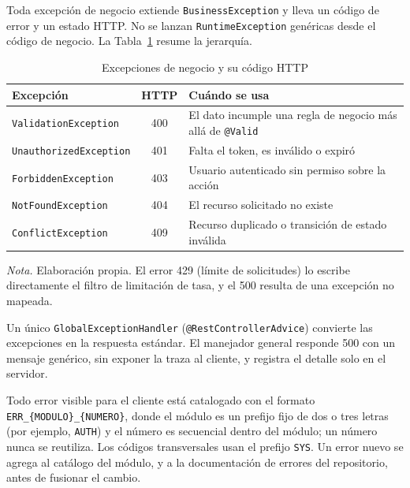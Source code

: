 Toda excepción de negocio extiende \texttt{BusinessException} y lleva un código de error y un estado HTTP. No se lanzan \texttt{RuntimeException} genéricas desde el código de negocio. La Tabla~\ref{tab:estandar_excepciones} resume la jerarquía.

\begin{table}[H]
\caption{Excepciones de negocio y su código HTTP}
\label{tab:estandar_excepciones}
\begin{threeparttable}
\begin{tabular}{>{\raggedright\arraybackslash}p{5.0cm} c >{\raggedright\arraybackslash}p{6.4cm}}
\toprule
Excepción & HTTP & Cuándo se usa \\
\midrule
\texttt{ValidationException} & 400 & El dato incumple una regla de negocio más allá de \texttt{@Valid} \\
\texttt{UnauthorizedException} & 401 & Falta el token, es inválido o expiró \\
\texttt{ForbiddenException} & 403 & Usuario autenticado sin permiso sobre la acción \\
\texttt{NotFoundException} & 404 & El recurso solicitado no existe \\
\texttt{ConflictException} & 409 & Recurso duplicado o transición de estado inválida \\
\bottomrule
\end{tabular}
\begin{tablenotes}
\item \textit{Nota.} Elaboración propia. El error 429 (límite de solicitudes) lo escribe directamente el filtro de limitación de tasa, y el 500 resulta de una excepción no mapeada.
\end{tablenotes}
\end{threeparttable}
\end{table}

Un único \texttt{GlobalExceptionHandler} (\texttt{@RestControllerAdvice}) convierte las excepciones en la respuesta estándar. El manejador general responde 500 con un mensaje genérico, sin exponer la traza al cliente, y registra el detalle solo en el servidor.

Todo error visible para el cliente está catalogado con el formato \texttt{ERR\_\{MODULO\}\_\{NUMERO\}}, donde el módulo es un prefijo fijo de dos o tres letras (por ejemplo, \texttt{AUTH}) y el número es secuencial dentro del módulo; un número nunca se reutiliza. Los códigos transversales usan el prefijo \texttt{SYS}. Un error nuevo se agrega al catálogo del módulo, y a la documentación de errores del repositorio, antes de fusionar el cambio.

